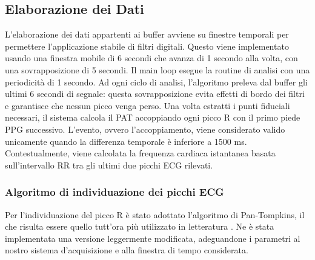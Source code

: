 \documentclass[11pt,a4paper]{article}
\begin{document}
\subsection{Elaborazione dei Dati}
L'elaborazione dei dati appartenti ai buffer avviene su finestre temporali per permettere l'applicazione stabile di filtri digitali. Questo viene implementato usando una finestra mobile di 6 secondi che avanza di 1 secondo alla volta, con una sovrapposizione di 5 secondi.
Il main loop esegue la routine di analisi con una periodicità di 1 secondo. Ad ogni ciclo di analisi, l'algoritmo preleva dal buffer gli ultimi 6 secondi di segnale: questa sovrapposizione evita effetti di bordo dei filtri e garantisce che nessun picco venga perso. Una volta estratti i punti fiduciali necessari, il sistema calcola il PAT accoppiando ogni picco R con il primo piede PPG successivo. L'evento, ovvero l'accoppiamento, viene considerato valido unicamente quando la differenza temporale è inferiore a 1500 ms. Contestualmente, viene calcolata la frequenza cardiaca istantanea basata sull'intervallo RR tra gli ultimi due picchi ECG rilevati.

\subsubsection{Algoritmo di individuazione dei picchi ECG}
Per l'individuazione del picco R è stato adottato l'algoritmo di Pan-Tompkins, il che risulta essere quello tutt'ora più utilizzato in letteratura \cite{mukkamala2015}. Ne è stata implementata una versione leggermente modificata, adeguandone i parametri al nostro sistema d'acquisizione e alla finestra di tempo considerata. 
\end{document}
